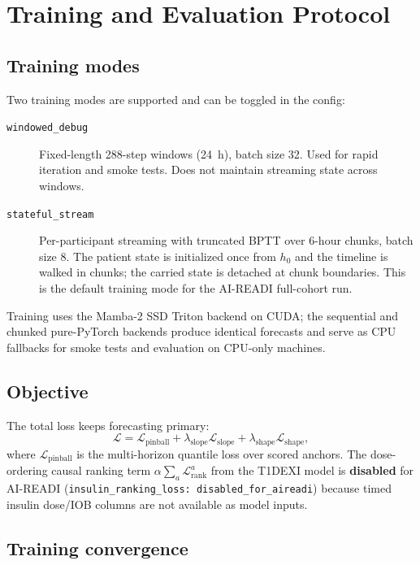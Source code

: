 \section{Training and Evaluation Protocol}
\label{sec:train}

\subsection{Training modes}

Two training modes are supported and can be toggled in the config:

\begin{description}
  \item[\texttt{windowed\_debug}] Fixed-length 288-step windows (24~h), batch size 32.
    Used for rapid iteration and smoke tests.  Does not maintain streaming state across windows.
  \item[\texttt{stateful\_stream}] Per-participant streaming with truncated BPTT over
    6-hour chunks, batch size 8.  The patient state is initialized once from $h_0$ and the
    timeline is walked in chunks; the carried state is detached at chunk boundaries.
    This is the default training mode for the AI-READI full-cohort run.
\end{description}

Training uses the Mamba-2 SSD Triton backend on CUDA; the sequential and chunked pure-PyTorch
backends produce identical forecasts and serve as CPU fallbacks for smoke tests and evaluation
on CPU-only machines.

\subsection{Objective}

The total loss keeps forecasting primary:
\begin{equation}
  \mathcal{L} = \mathcal{L}_{\text{pinball}}
  + \lambda_{\text{slope}}\mathcal{L}_{\text{slope}}
  + \lambda_{\text{shape}}\mathcal{L}_{\text{shape}}, \label{eq:loss}
\end{equation}
where $\mathcal{L}_{\text{pinball}}$ is the multi-horizon quantile loss over scored anchors.
The dose-ordering causal ranking term $\alpha\sum_a \mathcal{L}^a_{\text{rank}}$ from the
T1DEXI model is \textbf{disabled} for AI-READI
(\texttt{insulin\_ranking\_loss: disabled\_for\_aireadi}) because timed insulin
dose/IOB columns are not available as model inputs.

\subsection{Training convergence}

